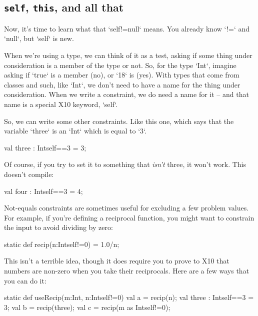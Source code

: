 \subsection{{\tt self}, {\tt this}, and all that}

Now, it's time to learn what that \xcd`self!=null` means.  You already know
\xcd`!=` and \xcd`null`, but \xcd`self` is new.  

When we're using a type, we can think of it as a test, asking if some thing
under consideration is a member of the type or not.  So, for the type
\xcd`Int`, imagine asking if \xcd`true` is a member (no), or \xcd`18` is
(yes).  With types that come from classes and such, like \xcd`Int`, we don't
need to have a name for the thing under consideration.
When we write a constraint, we do need a name for it -- and that name is
a special X10 keyword, \xcd`self`.  

So, we can write some other constraints.  Like this one, which says that the
variable \xcd`three` is an \xcd`Int` which is equal to \xcd`3`.  
\begin{xtennum}[]
val three : Int{self==3} = 3;
\end{xtennum}
Of course, if you try to set it to something that {\em isn't} three, it won't
work.  This doesn't compile:
\begin{xtennum}[]
val four : Int{self==3} = 4; 
\end{xtennum}

Not-equals constraints are sometimes useful for excluding a few problem
values.    For example, if you're defining a reciprocal function, you might
want to constrain the input to avoid dividing by zero:
\begin{xtennum}[]
static def recip(n:Int{self!=0}) = 1.0/n; 
\end{xtennum}

This isn't a terrible idea, though it does require you to prove to X10 that
numbers are non-zero when you take their reciprocals.  Here are a few ways
that you can do it: 
\begin{xtennum}[]
static def useRecip(m:Int, n:Int{self!=0}) {
  val a = recip(n); 
  val three : Int{self==3} = 3; 
  val b = recip(three);
  val c = recip(m as Int{self!=0});
}
\end{xtennum}


